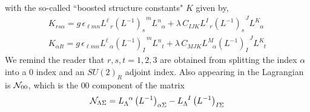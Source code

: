 \documentclass[12pt]{article}
\begin{document}
with the so-called ``boosted structure constants" $K$ given by,
\begin{eqnarray}
K_{r s \alpha} = g \,\epsilon_{\ell m n} L^{\ell}_{\,\,\,\, r} (L^{-1})_s^{\,\,\,\, m} L^n_{\,\,\,\,\alpha} + \lambda \,C_{I J K} L^I_{\,\,\,\,r} (L^{-1})_s^{\,\,\,\,J}L^K_{\,\,\,\,\,\alpha}
\nonumber\\
K_{\alpha I t} = g\, \epsilon_{\ell m n} L^{\ell}_{\,\,\,\, \alpha} (L^{-1})_I^{\,\,\,\, m} L^n_{\,\,\,\,t} + \lambda \,C_{M J K} L^M_{\,\,\,\,\,\alpha} (L^{-1})_I^{\,\,\,\,J}L^K_{\,\,\,\,\,t}
\end{eqnarray}
We remind the reader that $r,s,t = 1, 2, 3$ are obtained from splitting the index $\alpha$ into a 0 index and an $SU(2)_R$ adjoint index.  Also appearing in the Lagrangian is ${\cal N}_{00}$, which is the $00$ component of the matrix 
\begin{eqnarray}
{\cal N}_{\Lambda \Sigma} = L_\Lambda^{\,\,\,\,\alpha}\left( L^{-1}\right)_{\alpha \Sigma} -  L_\Lambda^{\,\,\,\,I}\left( L^{-1}\right)_{I \Sigma} 
\end{eqnarray}
\end{document}
